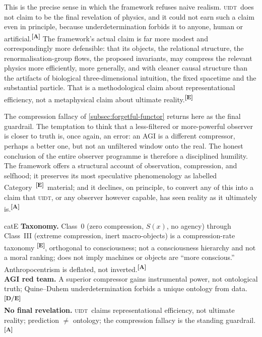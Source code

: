 \documentclass[12pt,a4paper,twoside]{article}
\theoremstyle{plain}
\theoremstyle{definition}
\theoremstyle{remark}
\newcommand{\UIDT}{\textsc{uidt}}
\newcommand{\catmark}[1]{\textsuperscript{\textsf{\textbf{[#1]}}}}
\begin{document}
This is the precise sense in which the framework refuses naive realism. \UIDT\ does not claim to be the final revelation of physics, and it could not earn such a claim even in principle, because underdetermination forbids it to anyone, human or artificial.\catmark{A} The framework's actual claim is far more modest and correspondingly more defensible: that its objects, the relational structure, the renormalisation-group flows, the proposed invariants, may compress the relevant physics more efficiently, more generally, and with cleaner causal structure than the artifacts of biological three-dimensional intuition, the fixed spacetime and the substantial particle. That is a methodological claim about representational efficiency, not a metaphysical claim about ultimate reality.\catmark{E}

The compression fallacy of \cref{subsec:forgetful-functor} returns here as the final guardrail. The temptation to think that a less-filtered or more-powerful observer is closer to truth is, once again, an error: an AGI is a different compressor, perhaps a better one, but not an unfiltered window onto the real. The honest conclusion of the entire observer programme is therefore a disciplined humility. The framework offers a structural account of observation, compression, and selfhood; it preserves its most speculative phenomenology as labelled Category~\catmark{E}\ material; and it declines, on principle, to convert any of this into a claim that \UIDT, or any observer however capable, has seen reality as it ultimately is.\catmark{A}

\begin{evidencebox}{catE}
\textbf{Taxonomy.} Class~0 (zero compression, $S(x)$, no agency) through Class~III (extreme compression, inert macro-objects) is a compression-rate taxonomy \catmark{E}, orthogonal to consciousness; not a consciousness hierarchy and not a moral ranking; does not imply machines or objects are ``more conscious.''
Anthropocentrism is deflated, not inverted.\catmark{A}\\[0.3em]
\textbf{AGI red team.} A superior compressor gains instrumental power, not ontological truth; Quine--Duhem underdetermination forbids a unique ontology from
data.\catmark{D/E}\\[0.3em]
\textbf{No final revelation.} \UIDT\ claims representational efficiency, not ultimate reality; prediction $\neq$ ontology; the compression fallacy is the standing guardrail.\catmark{A}
\end{evidencebox}
\end{document}
